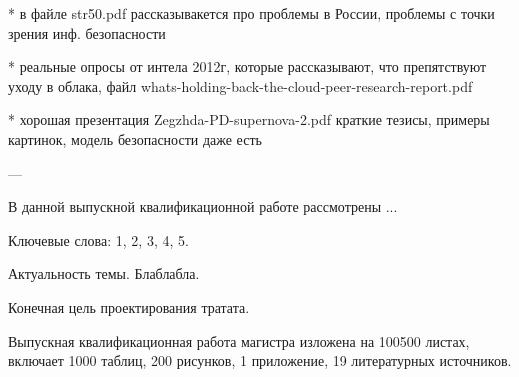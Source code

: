 * в файле str50.pdf рассказывакется про проблемы в России, проблемы с точки зрения инф. безопасности

* реальные опросы от интела 2012г, которые рассказывают, что препятствуют уходу в облака, файл whats-holding-back-the-cloud-peer-research-report.pdf

* хорошая презентация Zegzhda-PD-supernova-2.pdf краткие тезисы, примеры картинок, модель безопасности даже есть

---

В данной выпускной квалификационной работе рассмотрены ...

Ключевые слова: 1, 2, 3, 4, 5.

Актуальность темы. Блаблабла.

Конечная цель проектирования тратата.

Выпускная квалификационная работа магистра изложена на 100500 листах, включает 1000 таблиц, 200 рисунков, 1 приложение, 19 литературных источников.

\clearpage
